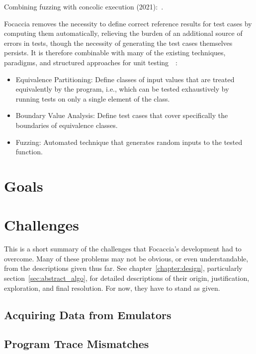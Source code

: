 Combining fuzzing with concolic execution (2021):~\cite{Borzacchiello2021Fuzzolic}.

Focaccia removes the necessity to define correct reference results for test cases by computing them automatically,
relieving the burden of an additional source of errors in tests, though the necessity of generating the test cases
themselves persists. It is therefore combinable with many of the existing techniques, paradigms, and structured
approaches for unit testing~\cite{jan2016innovative}~\cite{yu2011robust_planning}:

\begin{itemize}
    \item Equivalence Partitioning: Define classes of input values that are treated equivalently by the program, i.e.,
        which can be tested exhaustively by running tests on only a single element of the class.
    \item Boundary Value Analysis: Define test cases that cover specifically the boundaries of equivalence classes.
    \item Fuzzing: Automated technique that generates random inputs to the tested function.
\end{itemize}

\section{Goals}

\section{Challenges}

This is a short summary of the challenges that Focaccia's development had to overcome. Many of these problems may not be
obvious, or even understandable, from the descriptions given thus far. See chapter~\ref{chapter:design}, particularly
section~\ref{sec:abstract_algo}, for detailed descriptions of their origin, justification, exploration, and final
resolution. For now, they have to stand as given.

\subsection{Acquiring Data from Emulators}

\subsection{Program Trace Mismatches}
